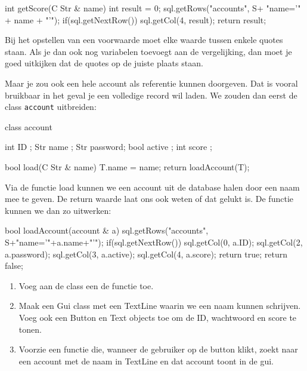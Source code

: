 \begin{code}
int getScore(C Str & name) {
  int result = 0;
	sql.getRows("accounts", S+ "name='" + name + "'");
	if(sql.getNextRow()) {
	  sql.getCol(4, result);
	}
	return result;
}
\end{code}

\begin{note}
Bij het opstellen van een voorwaarde moet elke waarde tussen enkele quotes staan. Als je dan ook nog variabelen toevoegt aan de vergelijking, dan moet je goed uitkijken dat de quotes op de juiste plaats staan.
\end{note}

Maar je zou ook een hele account als referentie kunnen doorgeven. Dat is vooral bruikbaar in het geval je een volledige record wil laden. We zouden dan eerst de class \texttt{account} uitbreiden:

\begin{code}
class account {
	int  ID      ;
	Str  name    ;
	Str  password;
	bool active  ;
	int  score   ;
	
	bool load(C Str & name) {
		T.name = name;
	  return loadAccount(T);
	}
}
\end{code}

Via de functie load kunnen we een account uit de database halen door een naam mee te geven. De return waarde laat ons ook weten of dat gelukt is. De functie  kunnen we dan zo uitwerken:

\begin{code}
bool loadAccount(account & a) {
  sql.getRows("accounts", S+"name='"+a.name+"'");
	if(sql.getNextRow()) {
		sql.getCol(0, a.ID);
		sql.getCol(2, a.password);
		sql.getCol(3, a.active);
		sql.getCol(4, a.score);
		return true;
  }
	return false;
}
\end{code}

\begin{exercise}
	\begin{enumerate}
		\item Voeg aan de class  een de functie  toe.
		\item Maak een Gui class met een TextLine waarin we een naam kunnen schrijven. Voeg ook een Button en Text objects toe om de ID, wachtwoord en score te tonen.
		\item Voorzie een functie die, wanneer de gebruiker op de button klikt, zoekt naar een account met de naam in TextLine en dat account toont in de gui.
	\end{enumerate}
\end{exercise}

